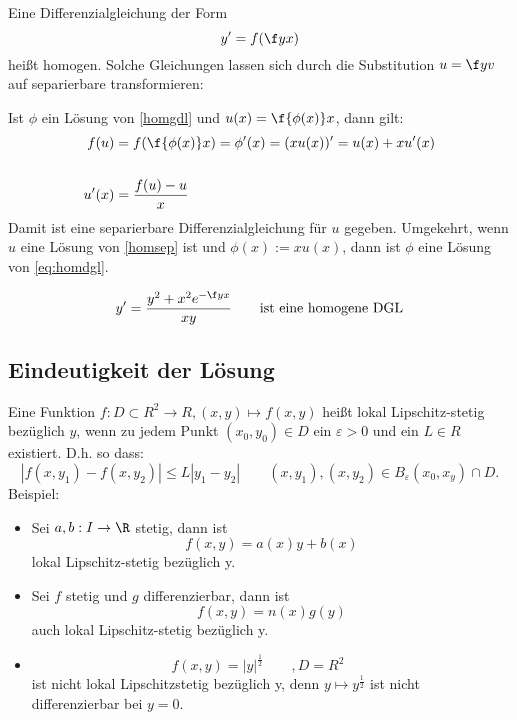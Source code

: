 \documentclass[a4paper,10pt]{scrartcl}
\begin{document}
Eine Differenzialgleichung der Form
\[
\label{eq:homdgl}
y'=f(\f yx)
\]
heißt homogen. Solche Gleichungen lassen sich durch die Substitution
$u=\f yv$ auf separierbare transformieren:

Ist $\phi$ ein Lösung von \eqref{homgdl} und $u(x) = \f{\phi (x)}x$, dann gilt:
\begin{align*}
	f(u) &= f(\f{\phi(x)}x) = \phi'(x) = (xu(x))'=u(x) + xu'(x)\\
\label{homsep}\\
u'(x) &= \frac{f(u)-u}{x}
\end{align*}
Damit ist eine separierbare Differenzialgleichung für $u$ gegeben.
Umgekehrt, wenn $u$ eine Lösung von \eqref{homsep} ist und $\phi(x):=xu(x)$, dann
ist $\phi$ eine Lösung von \eqref{eq:homdgl}.

\begin{ex*}
\[
y'=\frac{y^2+x^2e^{-\f yx}}{xy} \qquad \text{ist eine homogene DGL}
\]
\end{ex*}

\subsection{Eindeutigkeit der Lösung}

Eine Funktion $f:D\subset R^2\to R, (x,y)\mapsto f(x,y)$ heißt lokal Lipschitz-stetig
bezüglich $y$, wenn zu jedem Punkt $(x_0,y_0)\in D$ ein $\varepsilon > 0$ und ein $L\in R$ existiert.
D.h. so dass:
\[
|f(x,y_1)-f(x,y_2)| \le L|y_1-y_2| \qquad 
(x,y_1),(x,y_2) \in B_\varepsilon (x_0,x_y) \cap D.
\]
Beispiel:
\begin{itemize}
\item
Sei $a,b:I\to\R$ stetig, dann ist
\[
f(x,y)=a(x)y + b(x)
\]
lokal Lipschitz-stetig bezüglich y.
\item
Sei $f$ stetig und $g$ differenzierbar, dann ist
\[
f(x,y) = n(x)g(y)
\]
auch lokal Lipschitz-stetig bezüglich y.
\item
\[
f(x,y)={|y|}^{\frac 12} \qquad, D=R^2 \qquad
\]
ist nicht lokal Lipschitzstetig bezüglich y, denn $y\mapsto y^{\frac 12}$ ist nicht differenzierbar bei $y=0$.
\end{itemize}
\end{document}
